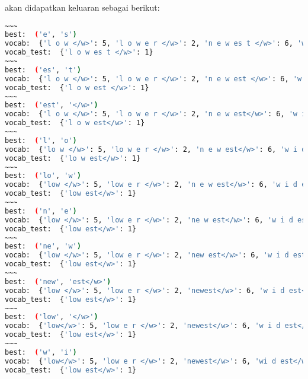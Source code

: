 akan didapatkan keluaran sebagai berikut:
\begin{lstlisting}[language=bash]
~~~
best:  ('e', 's')
vocab:  {'l o w </w>': 5, 'l o w e r </w>': 2, 'n e w es t </w>': 6, 'w i d es t </w>': 3}
vocab_test:  {'l o w es t </w>': 1}
~~~
best:  ('es', 't')
vocab:  {'l o w </w>': 5, 'l o w e r </w>': 2, 'n e w est </w>': 6, 'w i d est </w>': 3}
vocab_test:  {'l o w est </w>': 1}
~~~
best:  ('est', '</w>')
vocab:  {'l o w </w>': 5, 'l o w e r </w>': 2, 'n e w est</w>': 6, 'w i d est</w>': 3}
vocab_test:  {'l o w est</w>': 1}
~~~
best:  ('l', 'o')
vocab:  {'lo w </w>': 5, 'lo w e r </w>': 2, 'n e w est</w>': 6, 'w i d est</w>': 3}
vocab_test:  {'lo w est</w>': 1}
~~~
best:  ('lo', 'w')
vocab:  {'low </w>': 5, 'low e r </w>': 2, 'n e w est</w>': 6, 'w i d est</w>': 3}
vocab_test:  {'low est</w>': 1}
~~~
best:  ('n', 'e')
vocab:  {'low </w>': 5, 'low e r </w>': 2, 'ne w est</w>': 6, 'w i d est</w>': 3}
vocab_test:  {'low est</w>': 1}
~~~
best:  ('ne', 'w')
vocab:  {'low </w>': 5, 'low e r </w>': 2, 'new est</w>': 6, 'w i d est</w>': 3}
vocab_test:  {'low est</w>': 1}
~~~
best:  ('new', 'est</w>')
vocab:  {'low </w>': 5, 'low e r </w>': 2, 'newest</w>': 6, 'w i d est</w>': 3}
vocab_test:  {'low est</w>': 1}
~~~
best:  ('low', '</w>')
vocab:  {'low</w>': 5, 'low e r </w>': 2, 'newest</w>': 6, 'w i d est</w>': 3}
vocab_test:  {'low est</w>': 1}
~~~
best:  ('w', 'i')
vocab:  {'low</w>': 5, 'low e r </w>': 2, 'newest</w>': 6, 'wi d est</w>': 3}
vocab_test:  {'low est</w>': 1}
\end{lstlisting}